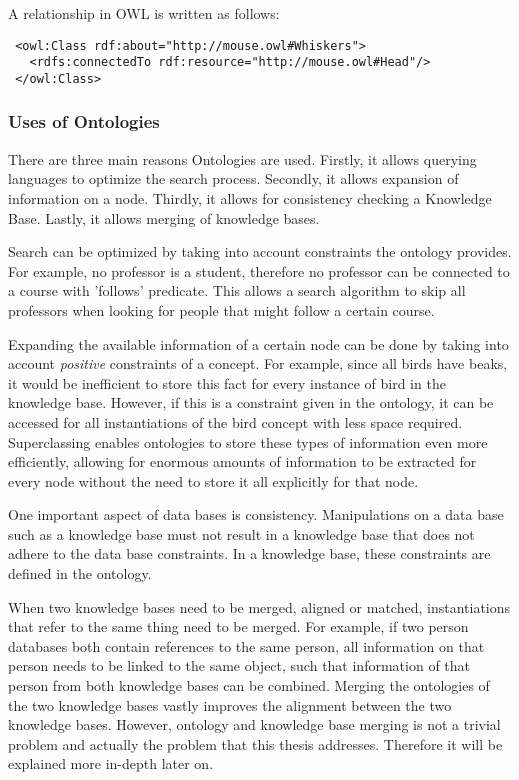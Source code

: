 \documentclass{article}
\begin{document}
 A relationship in OWL is written as follows:
 
 \lstset{language=XML}
 \begin{lstlisting}
 <owl:Class rdf:about="http://mouse.owl#Whiskers">
   <rdfs:connectedTo rdf:resource="http://mouse.owl#Head"/>
 </owl:Class>
 \end{lstlisting}
 
 \subsubsection{Uses of Ontologies}
 There are three main reasons Ontologies are used. Firstly, it allows querying languages to optimize the search process. Secondly, it allows expansion of information on a node. Thirdly, it allows for consistency checking a Knowledge Base. Lastly, it allows merging of knowledge bases.
 
 Search can be optimized by taking into account constraints the ontology provides. For example, no professor is a student, therefore no professor can be connected to a course with 'follows' predicate. This allows a search algorithm to skip all professors when looking for people that might follow a certain course.
 
 Expanding the available information of a certain node can be done by taking into account \textit{positive} constraints of a concept. For example, since all birds have beaks, it would be inefficient to store this fact for every instance of bird in the knowledge base. However, if this is a constraint given in the ontology, it can be accessed for all instantiations of the bird concept with less space required. Superclassing enables ontologies to store these types of information even more efficiently, allowing for enormous amounts of information to be extracted for every node without the need to store it all explicitly for that node.
 
 One important aspect of data bases is consistency. Manipulations on a data base such as a knowledge base must not result in a knowledge base that does not adhere to the data base constraints. In a knowledge base, these constraints are defined in the ontology.
 
 When two knowledge bases need to be merged, aligned or matched, instantiations that refer to the same thing need to be merged. For example, if two person databases both contain references to the same person, all information on that person needs to be linked to the same object, such that information of that person from both knowledge bases can be combined. Merging the ontologies of the two knowledge bases vastly improves the alignment between the two knowledge bases. However, ontology and knowledge base merging is not a trivial problem and actually the problem that this thesis addresses. Therefore it will be explained more in-depth later on\cite{09ontology}.
\end{document}
